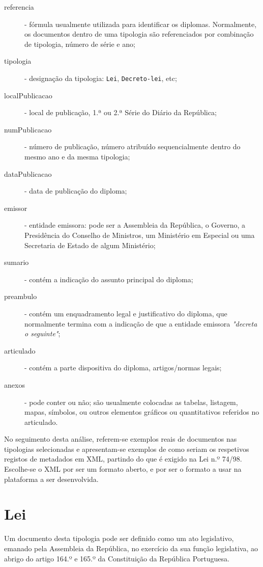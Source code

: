 \begin{description}
    \item[referencia] - fórmula usualmente utilizada para identificar os diplomas. 
    Normalmente, os documentos dentro de uma tipologia 
    são referenciados por combinação de tipologia, número de série e ano;
    \item[tipologia] - designação da tipologia: \texttt{Lei}, \texttt{Decreto-lei}, etc;
    \item[localPublicacao] - local de publicação, 1.ª ou 2.ª Série do 
    Diário da República;
    \item[numPublicacao] - número de publicação, número atribuído sequencialmente 
    dentro do mesmo ano e da mesma tipologia;
    \item[dataPublicacao] - data de publicação do diploma;
    \item[emissor] - entidade emissora: pode ser a Assembleia da República, o Governo, 
    a Presidência do Conselho de Ministros, um Ministério em Especial ou uma Secretaria 
    de Estado de algum Ministério;
    \item[sumario] - contém a indicação do assunto principal do diploma;
    \item[preambulo] - contém um enquadramento legal e justificativo do diploma, 
    que normalmente termina com a indicação de que a entidade emissora \emph{"decreta o seguinte"};
    \item[articulado] - contém a parte dispositiva do diploma, artigos/normas legais;
    \item[anexos] - pode conter ou não; são usualmente colocadas as tabelas, listagem, mapas, símbolos, 
    ou outros elementos gráficos ou quantitativos referidos no articulado.
\end{description}

No seguimento desta análise, referem-se exemplos reais de documentos nas tipologias selecionadas e apresentam-se 
exemplos de como seriam os respetivos registos de metadados em XML, partindo do que é exigido na Lei n.º 74/98. 
Escolhe-se o XML por ser um formato aberto, e por ser o formato a usar na plataforma a ser desenvolvida.

\section{Lei}

Um documento desta tipologia pode ser definido como um ato legislativo, emanado pela Assembleia da República, 
no exercício da sua função legislativa, ao abrigo do artigo 164.º e 165.º da Constituição da República Portuguesa.

